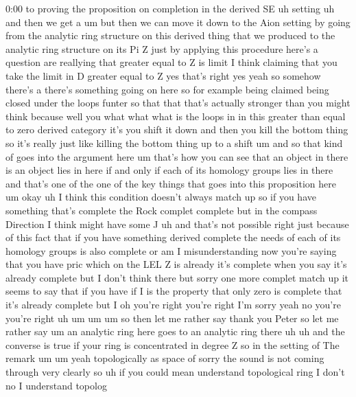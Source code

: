 \begin{unfinished}{0:00}
to  proving  the  proposition  on  completion
in  the  derived  SE  uh
setting  uh  and  then  we  get  a
um  but  then  we  can  move  it  down  to  the
Aion  setting  by  going  from  the  analytic
ring  structure  on  this  derived  thing
that  we  produced  to  the  analytic  ring
structure  on  its  Pi  Z  just  by  applying
this  procedure
here's  a
question  are  reallying  that  greater
equal  to  Z  is  limit  I  think  claiming
that  you  take  the  limit  in  D  greater
equal  to
Z  yes  that's  right
yes  yeah  so  somehow  there's  a  there's
something  going  on  here  so  for  example
being  claimed  being  closed  under  the
loops  funter  so  that  that  that's
actually  stronger  than  you  might  think
because  well  you  what  what  what  is  the
loops  in  in  this  greater  than  equal  to
zero  derived  category  it's  you  shift  it
down  and  then  you  kill  the  bottom  thing
so  it's  really  just  like  killing  the
bottom  thing  up  to  a  shift  um  and  so
that  kind  of  goes  into  the  argument  here
um  that's  how  you  can  see  that  an  object
in  there  is  an  object  lies  in  here  if
and  only  if  each  of  its  homology  groups
lies  in  there  and  that's  one  of  the  one
of  the  key  things  that  goes  into  this
proposition  here
um
okay  uh  I  think  this  condition  doesn't
always  match  up  so  if  you  have  something
that's  complete  the  Rock  complet
complete  but  in  the  compass  Direction  I
think  might
have  some
J
uh  and  that's  not  possible  right  just
because  of  this  fact  that  if  you  have
something  derived  complete  the  needs  of
each  of  its  homology  groups  is  also
complete  or  am  I
misunderstanding  now  you're  saying  that
you  have
pric  which  on  the  LEL  Z  is
already  it's  complete  when  you  say  it's
already  complete  but  I  don't  think
there  but
sorry  one  more  complet  match  up  it  seems
to  say  that  if  you  have
if  I  is  the  property  that  only
zero  is  complete  that  it's  already
complete  but  I  oh  you're  right  you're
right  I'm  sorry  yeah  no  you're  you're
right
uh
um
um
um  so  then  let  me  rather  say  thank  you
Peter  so  let  me  rather  say  um  an
analytic  ring  here  goes  to  an  analytic
ring  there
uh
uh  and  the  converse  is  true  if  your  ring
is  concentrated  in  degree  Z  so  in  the
setting  of  The  remark
um
um
yeah  topologically  as  space  of
sorry  the  sound  is  not  coming  through
very  clearly  so  uh  if  you
could
mean
understand  topological
ring  I  don't  no  I
understand
topolog

\end{unfinished}
